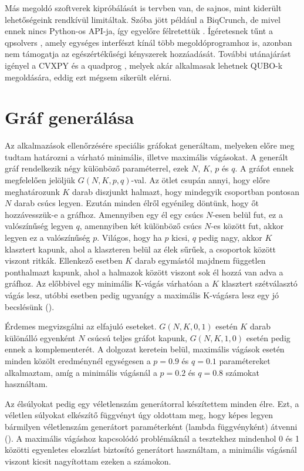 Más megoldó szoftverek kipróbálását is tervben van, de sajnos, mint kiderült lehetőségeink rendkívül limitáltak. Szóba jött például a BiqCrunch, de mivel ennek nincs Python-os API-ja, így egyelőre félretettük \cite{biqcrunch}. Ígéretesnek tűnt a qpsolvers \cite{qpsolvers}, amely egységes interfészt kínál több megoldóprogramhoz is, azonban nem támogatja az egészértékűségi kényszerek hozzáadását. További utánajárást igényel a CVXPY \cite{cvxpy} és a quadprog \cite{quadprog}, melyek akár alkalmasak lehetnek QUBO-k megoldására, eddig ezt mégsem sikerült elérni.

\section{Gráf generálása}\label{sec:graphGeneration}
Az alkalmazások ellenőrzésére speciális gráfokat generáltam, melyeken előre meg tudtam határozni a várható minimális, illetve maximális vágásokat. A generált gráf rendelkezik négy különböző paraméterrel, ezek $N$, $K$, $p$ és $q$. A gráfot ennek megfelelően jelöljük $G(N,K,p,q)$-val.
Az ötlet csupán annyi, hogy előre meghatározunk $K$ darab diszjunkt halmazt, hogy mindegyik csoportban pontosan $N$ darab csúcs legyen. Ezután minden élről egyénileg döntünk, hogy őt hozzávesszük-e a gráfhoz. Amennyiben egy él egy csúcs $N$-esen belül fut, ez a valószínűség legyen $q$, amennyiben két különböző csúcs $N$-es között fut, akkor legyen ez a valószínűség $p$. Világos, hogy ha $p$ kicsi, $q$ pedig nagy, akkor $K$ klasztert kapunk, ahol a klaszteren belül az élek sűrűek, a csoportok között viszont ritkák. Ellenkező esetben $K$ darab egymástól majdnem független ponthalmazt kapunk, ahol a halmazok között viszont sok él hozzá van adva a gráfhoz. Az előbbivel egy minimális K-vágás várhatóan a $K$ klasztert szétválasztó vágás lesz, utóbbi esetben pedig ugyanígy a maximális K-vágásra lesz egy jó becslésünk (). 

Érdemes megvizsgálni az elfajuló eseteket. $G(N,K,0,1)$ esetén $K$ darab különálló egyenként $N$ csúcsú teljes gráfot kapunk, $G(N,K,1,0)$ esetén pedig ennek a komplementerét. A dolgozat keretein belül, maximális vágások esetén minden közölt eredménynél egységesen a $p=0.9$ és $q=0.1$ paramétereket alkalmaztam, amíg a minimális vágásnál a $p=0.2$ és $q=0.8$ számokat használtam.

Az élsúlyokat pedig egy véletlenszám generátorral készítettem minden élre. Ezt, a véletlen súlyokat elkészítő függvényt úgy oldottam meg, hogy képes legyen bármilyen véletlenszám generátort paraméterként (lambda függvényként) átvenni ().
A maximális vágáshoz kapcsolódó problémáknál a tesztekhez mindenhol 0 és 1 közötti egyenletes eloszlást biztosító generátort használtam, a minimális vágásnál viszont kicsit nagyítottam ezeken a számokon.

